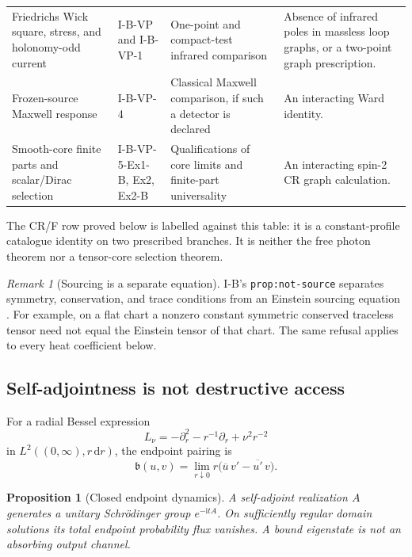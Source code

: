 \documentclass[11pt,a4paper]{article}
\newcommand{\dd}{\mathrm d}
\newcommand{\ii}{\mathrm i}
\newcommand{\loc}[1]{\nolinkurl{#1}}
\theoremstyle{plain}
\newtheorem{proposition}[theorem]{Proposition}
\theoremstyle{definition}
\theoremstyle{remark}
\newtheorem{remark}[theorem]{Remark}
\numberwithin{equation}{section}
\begin{document}
\begin{longtable}{@{}L{.20\linewidth}L{.22\linewidth}
                      L{.26\linewidth}L{.25\linewidth}@{}}
Friedrichs Wick square, stress, and holonomy-odd current &
I-B-VP and I-B-VP-1 \cite{CheungVP,CheungVP1} &
One-point and compact-test infrared comparison &
Absence of infrared poles in massless loop graphs, or a
two-point graph prescription.\\

Frozen-source Maxwell response &
I-B-VP-4 \cite{CheungVP4} &
Classical Maxwell comparison, if such a detector is declared &
An interacting Ward identity.\\

Smooth-core finite parts and scalar/Dirac selection &
I-B-VP-5-Ex1-B, Ex2, Ex2-B
\cite{CheungEx1B,CheungEx2,CheungEx2B} &
Qualifications of core limits and finite-part universality &
An interacting spin-2 CR graph calculation.\\
\end{longtable}
\endgroup

The CR/F row proved below is labelled against this table:
it is a constant-profile catalogue identity on two prescribed
branches. It is neither the free photon theorem nor a tensor-core
selection theorem.

\begin{remark}[Sourcing is a separate equation]
I-B's \loc{prop:not-source} separates symmetry, conservation, and
trace conditions from an Einstein sourcing equation
\cite{CheungIB}. For example, on a flat chart a nonzero constant
symmetric conserved traceless tensor need not equal the
Einstein tensor of that chart.
The same refusal applies to every heat coefficient below.
\end{remark}

\subsection{Self-adjointness is not destructive access}

For a radial Bessel expression
\[
 L_\nu=-\partial_r^2-r^{-1}\partial_r+\nu^2r^{-2}
\]
in \(L^2((0,\infty),r\,\dd r)\), the endpoint pairing is
\begin{equation}
 \mathfrak b(u,v)=
 \lim_{r\downarrow0}r
 \bigl(\overline u\,v'-\overline{u'}\,v\bigr).
 \label{eq:boundary}
\end{equation}

\begin{proposition}[Closed endpoint dynamics]
\label{prop:unitary}
A self-adjoint realization \(A\) generates a unitary
Schr\"odinger group \(e^{-\ii tA}\). On sufficiently regular
domain solutions its total endpoint probability flux vanishes.
A bound eigenstate is not an absorbing output channel.
\end{proposition}
\end{document}
